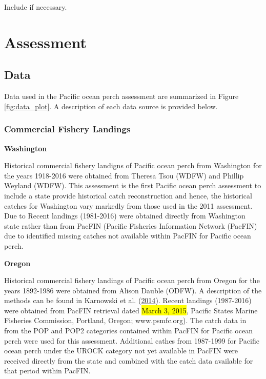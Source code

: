 \documentclass[12pt,]{article}
\begin{document}
Include if necessary.

\section{Assessment}\label{assessment}

\subsection{Data}\label{data}

Data used in the Pacific ocean perch assessment are summarized in Figure
\ref{fig:data_plot}. A description of each data source is provided
below.

\subsubsection{Commercial Fishery
Landings}\label{commercial-fishery-landings}

\textbf{Washington}

Historical commercial fishery landigns of Pacific ocean perch from
Washington for the years 1918-2016 were obtained from Theresa Tsou
(WDFW) and Phillip Weyland (WDFW). This assessment is the first Pacific
ocean perch assessment to include a state provide historical catch
reconstruction and hence, the historical catches for Washington vary
markedly from those used in the 2011 assessment. Due to Recent landings
(1981-2016) were obtained directly from Washington state rather than
from PacFIN (Pacific Fisheries Information Network (PacFIN) due to
identified missing catches not available within PacFIN for Pacific ocean
perch.

\textbf{Oregon}

Historical commercial fishery landings of Pacific ocean perch from
Oregon for the years 1892-1986 were obtained from Alison Dauble (ODFW).
A description of the methods can be found in Karnowski et al.
(\protect\hyperlink{ref-karnowski_historical_2014}{2014}). Recent
landings (1987-2016) were obtained from PacFIN retrieval dated
\hl{March 3, 2015}, Pacific States Marine Fisheries Commission,
Portland, Oregon; www.psmfc.org). The catch data in from the POP and
POP2 categories contained within PacFIN for Pacific ocean perch were
used for this assessment. Additional cathes from 1987-1999 for Pacific
ocean perch under the UROCK category not yet available in PacFIN were
received directly from the state and combined with the catch data
available for that period within PacFIN.
\end{document}
